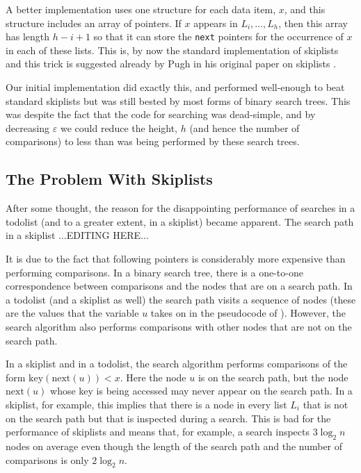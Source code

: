 \documentclass[lotsofwhite]{patmorin}
\newcommand{\eps}{\varepsilon}
\begin{document}
A better implementation uses one structure for each data item, $x$,
and this structure includes an array of pointers.  If $x$ appears in
$L_{i},\ldots,L_h$, then this array has length $h-i+1$ so that it can
store the \texttt{next} pointers for the occurrence of $x$ in each of
these lists.  This is, by now the standard implementation of skiplists
and this trick is suggested already by Pugh in his original paper on
skiplists \cite{pXX}.

Our initial implementation did exactly this, and performed well-enough
to beat standard skiplists but was still bested by most forms of binary
search trees.  This was despite the fact that the code for searching was
dead-simple, and by decreasing $\eps$ we could reduce the height, $h$
(and hence the number of comparisons) to less than was being performed
by these search trees.

\subsection{The Problem With Skiplists}

After some thought, the reason for the disappointing performance of
searches in a todolist (and to a greater extent, in a skiplist) became
apparent.  The search path in a skiplist ...EDITING HERE...



 It is due to the fact that following pointers is considerably
more expensive than performing comparisons.  In a binary search tree,
there is a one-to-one correspondence between comparisons and the nodes
that are on a search path.  In a todolist (and a skiplist as well) the
search path visits a sequence of nodes (these are the values that the
variable $u$ takes on in the pseudocode of ).
However, the search algorithm also performs comparisons with other nodes
that are not on the search path.

In a skiplist and in a todolist, the search algorithm performs comparisons
of the form $\mathrm{key}(\mathrm{next}(u)) < x$.  Here the node $u$
is on the search path, but the node $\mathrm{next}(u)$ whose key is
being accessed may never appear on the search path.  In a skiplist,
for example, this implies that there is a node in every list $L_i$
that is not on the search path but that is inspected during a search.
This is bad for the performance of skiplists and means that, for example,
a search inspects $3\log_2 n$ nodes on average even though the length
of the search path and the number of comparisons is only $2\log_2 n$.
\end{document}
